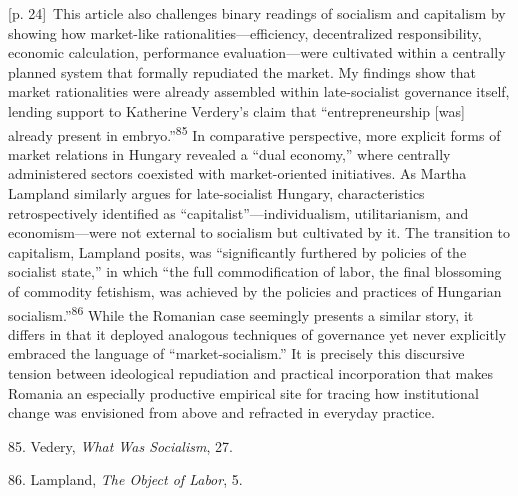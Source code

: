 \documentclass[10pt,a4paper]{article}
\begin{document}
{\scriptsize\color{gray} [p. 24]}\ This article also challenges binary readings of socialism and capitalism by showing how market-like rationalities—efficiency, decentralized responsibility, economic calculation, performance evaluation—were cultivated within a centrally planned system that formally repudiated the market. My findings show that market rationalities were already assembled within late-socialist governance itself, lending support to Katherine Verdery’s claim that “entrepreneurship [was] already present in embryo.”\nobreak\textsuperscript{85} In comparative perspective, more explicit forms of market relations in Hungary revealed a “dual economy,” where centrally administered sectors coexisted with market-oriented initiatives. As Martha Lampland similarly argues for late-socialist Hungary, characteristics retrospectively identified as “capitalist”—individualism, utilitarianism, and economism—were not external to socialism but cultivated by it. The transition to capitalism, Lampland posits, was “significantly furthered by policies of the socialist state,” in which “the full commodification of labor, the final blossoming of commodity fetishism, was achieved by the policies and practices of Hungarian socialism.”\nobreak\textsuperscript{86} While the Romanian case seemingly presents a similar story, it differs in that it deployed analogous techniques of governance yet never explicitly embraced the language of “market-socialism.” It is precisely this discursive tension between ideological repudiation and practical incorporation that makes Romania an especially productive empirical site for tracing how institutional change was envisioned from above and refracted in everyday practice.\par{\small 85. Vedery, \textit{What Was Socialism}, 27.\par}{\small 86. Lampland, \textit{The Object of Labor}, 5.\par}
\end{document}
